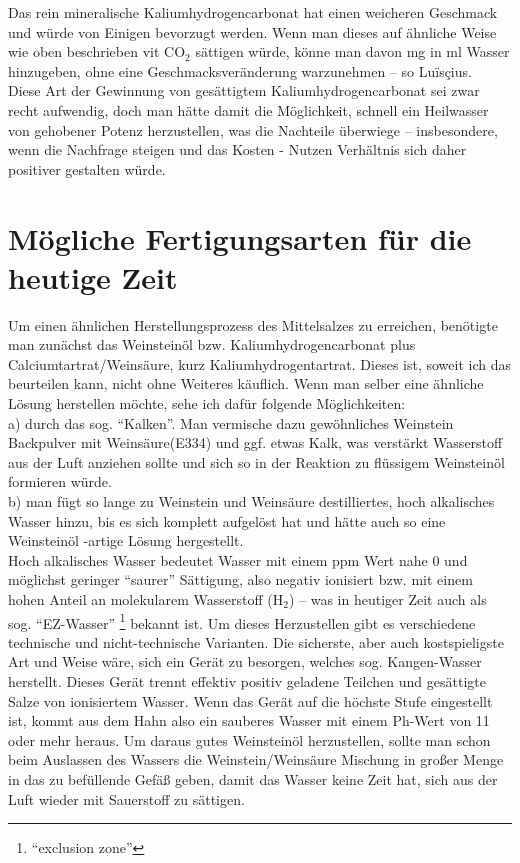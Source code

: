 \documentclass[a5paper,8pt]{scrbook}
\newcommand\ouncesofpound{12}
\newcommand\quentinsofounce{8}
\newcommand\gransofquentins{63}
\newcommand\gramsofpound{372}
\newcommand\gramofounce{\fpeval{\gramsofpound / \ouncesofpound}}
\newcommand\gramofgran{\fpeval{\gramsofpound / \ouncesofpound / \quentinsofounce / \gransofquentins}}
\begin{document}
\FPeval\x{round(16*\gramofounce:0)}%
\FPeval\x{round(3*\gramofgran*1000:0)}%
Das rein mineralische Kaliumhydrogencarbonat hat einen weicheren Geschmack und würde von Einigen bevorzugt werden. Wenn man dieses auf ähnliche Weise wie oben beschrieben vit CO$_2$ sättigen würde, könne man davon \numprint{\x} mg in \numprint{\a} ml Wasser hinzugeben, ohne eine Geschmacksveränderung warzunehmen -- so Luïsçius.\\

Diese Art der Gewinnung von gesättigtem Kaliumhydrogencarbonat sei zwar recht aufwendig, doch man hätte damit die Möglichkeit, schnell ein Heilwasser von gehobener Potenz herzustellen, was die Nachteile überwiege -- insbesondere, wenn die Nachfrage steigen und das Kosten - Nutzen Verhältnis sich daher positiver gestalten würde.\\


\newpage

\section{Mögliche Fertigungsarten für die heutige Zeit}

Um einen ähnlichen Herstellungsprozess des Mittelsalzes zu erreichen, benötigte man zunächst das Weinsteinöl bzw. Kaliumhydrogencarbonat plus Calciumtartrat/Weinsäure, kurz Kaliumhydrogentartrat. Dieses ist, soweit ich das beurteilen kann, nicht ohne Weiteres käuflich. Wenn man selber eine ähnliche Lösung herstellen möchte, sehe ich dafür folgende Möglichkeiten:\\

a) durch das sog. ``Kalken''.
Man vermische dazu gewöhnliches Weinstein Backpulver
mit Weinsäure(E334) und ggf. etwas Kalk,
was verstärkt Wasserstoff aus der Luft anziehen sollte
und sich so in der Reaktion
zu flüssigem Weinsteinöl formieren würde.\\

b) man fügt so lange zu Weinstein und Weinsäure
destilliertes, hoch alkalisches Wasser hinzu,
bis es sich komplett aufgelöst hat
und hätte auch so eine Weinsteinöl%
\hyp{}artige Lösung hergestellt.\\

Hoch alkalisches Wasser bedeutet Wasser mit einem ppm Wert nahe 0 und möglichst geringer ``saurer'' Sättigung, also negativ ionisiert bzw. mit einem hohen Anteil an molekularem Wasserstoff (H$_2$) -- was in heutiger Zeit auch als sog. ``EZ-Wasser''%
\footnote{``exclusion zone''}
bekannt ist. Um dieses Herzustellen gibt es verschiedene technische und nicht-technische Varianten. Die sicherste, aber auch kostspieligste Art und Weise wäre, sich ein Gerät zu besorgen, welches sog. Kangen-Wasser herstellt. Dieses Gerät trennt effektiv positiv geladene Teilchen und gesättigte Salze von ionisiertem Wasser. Wenn das Gerät auf die höchste Stufe eingestellt ist, kommt aus dem Hahn also ein sauberes Wasser mit einem Ph-Wert von 11 oder mehr heraus. Um daraus gutes Weinsteinöl herzustellen, sollte man schon beim Auslassen des Wassers die Weinstein/Weinsäure Mischung in großer Menge in das zu befüllende Gefäß geben, damit das Wasser keine Zeit hat, sich aus der Luft wieder mit Sauerstoff zu sättigen.\\
\end{document}
